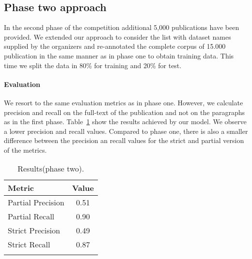 \subsection{Phase two approach}
In the second phase of the competition additional 5,000 publications have been provided. We extended our approach to consider the list with dataset names supplied by the organizers and re-annotated the complete corpus of 15.000 publication in the same manner as in phase one to obtain training data. This time we split the data in 80\% for training and 20\% for test.   

\paragraph{Evaluation}
We resort to the same evaluation metrics as in phase one. However, we calculate precision and recall on the full-text of the publication and not on the paragraphs as in the first phase. Table~\ref{table:dataset-mention-eval-phase-two} show the results achieved by our model. We observe a lower precision and recall values. Compared to phase one, there is also a smaller difference between the precision an recall values for the strict and partial version of the metrics. 
\begin{table}[hb]
    \center 
    \caption{Results(phase two).} 
    \begin{tabular}{lc} 
        \toprule
        Metric  & Value \\
        \midrule
        Partial Precision   & 0.51 \\
        Partial Recall      & 0.90 \\
        \midrule
        Strict Precision    & 0.49 \\
        Strict Recall       & 0.87 \\ 
        \bottomrule \\ 
    \end{tabular} 
    \label{table:dataset-mention-eval-phase-two} 
\end{table}

